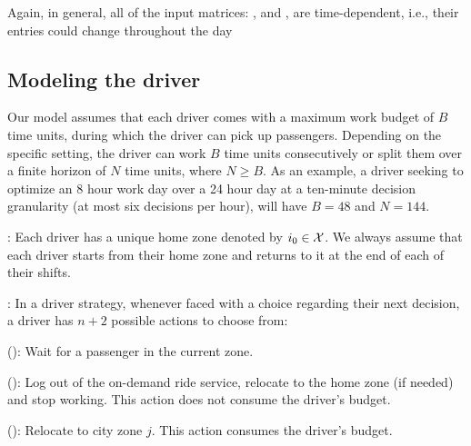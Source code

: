 Again, in general, all of the input matrices: %
{\empiricaltransitionmatrix}, {\traveltimematrix} and {\rewardsmatrix}, 
are time-dependent, i.e., their entries could change throughout the day


\subsection{Modeling the driver}
Our model assumes that 
each driver comes with a 
maximum work budget of $B$ time units, during which the driver 
 can pick up passengers. Depending on the specific setting, the driver can
work $B$ time units consecutively or split them 
over a finite horizon of $N$ time units, where $N \geq B$. 
As an example, a driver seeking to optimize an 8 hour work day over
a 24 hour day at a ten-minute decision granularity (at most six decisions per hour), 
will have $B=48$ and $N=144$.


: 
Each driver has a unique home zone denoted by $i_0 \in \mathcal{X}$. 
We always assume that each driver starts from their home zone and returns to it
at the end of each of their shifts.

: 
In a driver strategy, whenever faced with a choice regarding their
  next decision, a driver has $n+2$ possible actions to choose from: 
\squishlist
    \item {\getpassenger} (\getpassengeraction): Wait for a passenger in the current zone. 
    \item {\gohome} (\gohomeaction): Log out of the on-demand ride service, relocate to the home zone (if needed) 
  and stop working.   This action does not consume the driver's budget.
    \item {\relocate} (\relocateaction): Relocate to city zone $j$.  This action consumes the driver's budget.
\squishend


